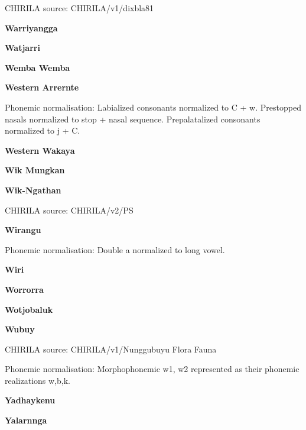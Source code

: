 CHIRILA source: CHIRILA/v1/dixbla81


\textbf{Warriyangga}


\textbf{Watjarri}


\textbf{Wemba Wemba}


\newpage


\textbf{Western Arrernte}


Phonemic normalisation: Labialized consonants normalized to C + w.
Prestopped nasals normalized to stop + nasal sequence. Prepalatalized
consonants normalized to j + C.

\textbf{Western Wakaya}


\textbf{Wik Mungkan}


\textbf{Wik-Ngathan}

CHIRILA source: CHIRILA/v2/PS


\textbf{Wirangu}


Phonemic normalisation: Double a normalized to long vowel.

\textbf{Wiri}


\textbf{Worrorra}


\textbf{Wotjobaluk}


\textbf{Wubuy}

CHIRILA source: CHIRILA/v1/Nunggubuyu Flora Fauna


Phonemic normalisation: Morphophonemic w1, w2 represented as their
phonemic realizations w,b,k.

\textbf{Yadhaykenu}


\textbf{Yalarnnga}

